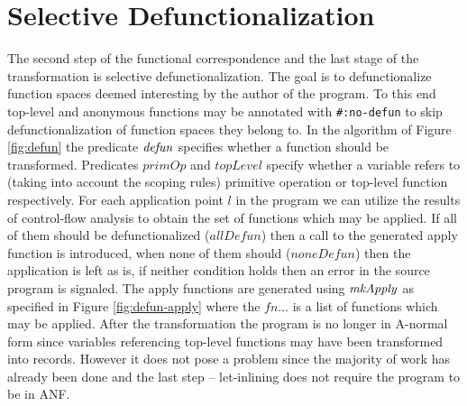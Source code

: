 \section{Selective Defunctionalization}\label{sec:selective-defun}
The second step of the functional correspondence and the last stage of the transformation is selective defunctionalization.
The goal is to defunctionalize function spaces deemed interesting by the author of the program.
To this end top-level and anonymous functions may be annotated with \lstinline!#:no-defun! to skip defunctionalization of function spaces they belong to.
In the algorithm of Figure \ref{fig:defun} the predicate $\mathit{defun}$ specifies whether a function should be transformed.
Predicates $\mathit{primOp}$ and $\mathit{topLevel}$ specify whether a variable refers to (taking into account the scoping rules) primitive operation or top-level function respectively.
For each application point $l$ in the program we can utilize the results of control-flow analysis to obtain the set of functions which may be applied.
If all of them should be defunctionalized ($\mathit{allDefun}$) then a call to the generated apply function is introduced, when none of them should ($\mathit{noneDefun}$) then the application is left as is, if neither condition holds then an error in the source program is signaled.
The apply functions are generated using $\mathit{mkApply}$ as specified in Figure \ref{fig:defun-apply} where the $\mathit{fn}\ldots$ is a list of functions which may be applied.
After the transformation the program is no longer in A-normal form since variables referencing top-level functions may have been transformed into records.
However it does not pose a problem since the majority of work has already been done and the last step -- let-inlining does not require the program to be in ANF.



